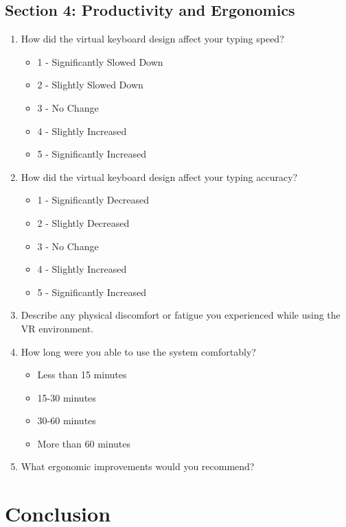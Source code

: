 \subsection{Section 4: Productivity and Ergonomics}
\begin{enumerate}
    \item How did the virtual keyboard design affect your typing speed?
    \begin{itemize}
        \item 1 - Significantly Slowed Down
        \item 2 - Slightly Slowed Down
        \item 3 - No Change
        \item 4 - Slightly Increased
        \item 5 - Significantly Increased
    \end{itemize}
    \item How did the virtual keyboard design affect your typing accuracy?
    \begin{itemize}
        \item 1 - Significantly Decreased
        \item 2 - Slightly Decreased
        \item 3 - No Change
        \item 4 - Slightly Increased
        \item 5 - Significantly Increased
    \end{itemize}
    \item Describe any physical discomfort or fatigue you experienced while using the VR environment.
    \item How long were you able to use the system comfortably?
    \begin{itemize}
        \item Less than 15 minutes
        \item 15-30 minutes
        \item 30-60 minutes
        \item More than 60 minutes
    \end{itemize}
    \item What ergonomic improvements would you recommend?
\end{enumerate}
\section{Conclusion}

